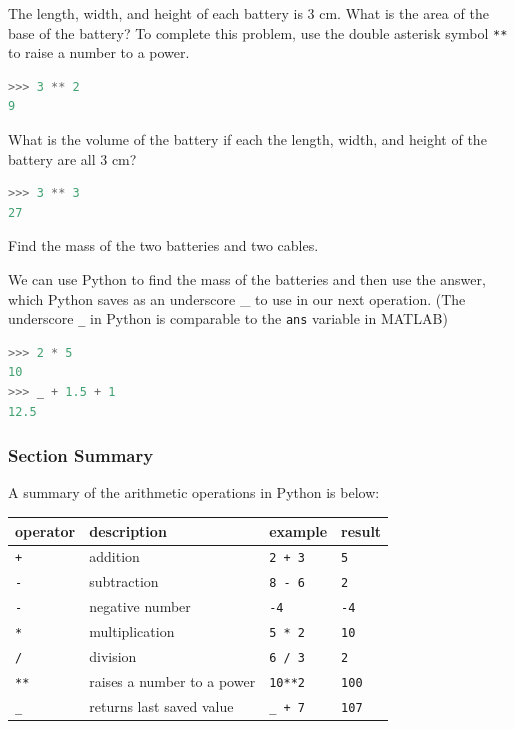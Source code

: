 \documentclass{book}
\begin{document}
The length, width, and height of each battery is 3 cm. What is the area
of the base of the battery? To complete this problem, use the double
asterisk symbol \lstinline!**! to raise a number to a power.

\begin{lstlisting}[language=Python]
>>> 3 ** 2
9
\end{lstlisting}

What is the volume of the battery if each the length, width, and height
of the battery are all 3 cm?

\begin{lstlisting}[language=Python]
>>> 3 ** 3
27
\end{lstlisting}

Find the mass of the two batteries and two cables.

We can use Python to find the mass of the batteries and then use the
answer, which Python saves as an underscore \_ to use in our next
operation. (The underscore \lstinline!_! in Python is comparable to the
\lstinline!ans! variable in MATLAB)

\begin{lstlisting}[language=Python]
>>> 2 * 5 
10
>>> _ + 1.5 + 1
12.5
\end{lstlisting}
    




    
        \subsubsection{Section Summary}\label{section-summary}

A summary of the arithmetic operations in Python is below:

\begin{longtable}[]{@{}llll@{}}
\toprule
operator & description & example & result\tabularnewline
\midrule
\endhead
\lstinline!+! & addition & \lstinline!2 + 3! &
\lstinline!5!\tabularnewline
\lstinline!-! & subtraction & \lstinline!8 - 6! &
\lstinline!2!\tabularnewline
\lstinline!-! & negative number & \lstinline!-4! &
\lstinline!-4!\tabularnewline
\lstinline!*! & multiplication & \lstinline!5 * 2! &
\lstinline!10!\tabularnewline
\lstinline!/! & division & \lstinline!6 / 3! &
\lstinline!2!\tabularnewline
\lstinline!**! & raises a number to a power & \lstinline!10**2! &
\lstinline!100!\tabularnewline
\lstinline!_! & returns last saved value & \lstinline!_ + 7! &
\lstinline!107!\tabularnewline
\bottomrule
\end{longtable}
    
\end{document}
